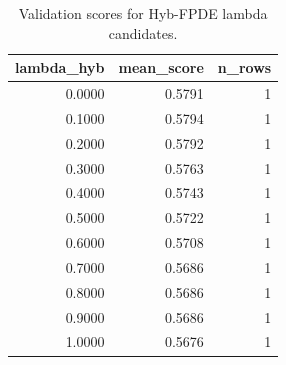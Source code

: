 \begin{table}[t]
\caption{Validation scores for Hyb-FPDE lambda candidates.}
\label{tab:lambda_distribution_computed}
\centering
\begin{tabular}{rrr}
\toprule
lambda\_hyb & mean\_score & n\_rows \\
\midrule
0.0000 & 0.5791 & 1 \\
0.1000 & 0.5794 & 1 \\
0.2000 & 0.5792 & 1 \\
0.3000 & 0.5763 & 1 \\
0.4000 & 0.5743 & 1 \\
0.5000 & 0.5722 & 1 \\
0.6000 & 0.5708 & 1 \\
0.7000 & 0.5686 & 1 \\
0.8000 & 0.5686 & 1 \\
0.9000 & 0.5686 & 1 \\
1.0000 & 0.5676 & 1 \\
\bottomrule
\end{tabular}

\end{table}
